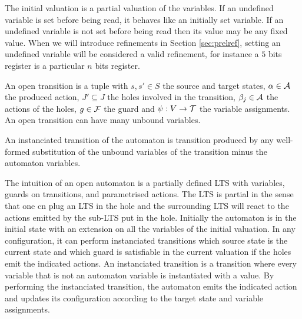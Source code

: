 \documentclass{article}
\begin{document}
The initial valuation is a partial valuation of the variables.
If an undefined variable is set before being read, it behaves like an initially set variable.
If an undefined variable is not set before being read then its value may be any fixed value.
When we will introduce refinements in Section \ref{sec:prelref}, setting an undefined variable will be considered a valid refinement, for instance a \(5\) bits register is a particular \(n\) bits register.
\begin{defi}
An open transition is a tuple \nmm{\OTg} with \(s, s' \in S\) the source and target states, \(\alpha \in \mathcal{A}\) the produced action, \(J' \subseteq J\) the holes involved in the transition, \(\beta_j \in \mathcal{A}\) the actions of the holes, \(g \in {\mathcal{F}}\) the guard and \(\psi: V \to {\mathcal{T}}\) the variable assignments.
An open transition can have many unbound variables.

An instanciated transition of the automaton is transition produced by any well-formed substitution of the unbound variables of the transition minus the automaton variables.
\end{defi}
The intuition of an open automaton is a partially defined LTS with variables, guards on transitions, and parametrised actions. The LTS is partial in the sense that one cn plug an LTS in the hole and the surrounding LTS will react to the actions emitted by the sub-LTS put in the hole.
Initially the automaton is in the initial state with an extension on all the variables of the initial valuation.
In any configuration, it can perform instanciated transitions which source state is the current state and which guard is satisfiable in the current valuation if the holes emit the indicated actions.
An instanciated transition is a transition where every variable that is not an automaton variable is instantiated with a value.
By performing the instanciated transition, the automaton emits the indicated action and updates its configuration according to the target state and variable assignments.
\end{document}
